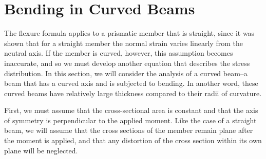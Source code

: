 \documentclass[
10pt,
a4paper,
openany,
svgnames,
]{book} %
\begin{document}
\section{Bending in Curved Beams}
                
The flexure formula applies to a prismatic member that is straight, since it was shown that for a straight member the normal strain varies linearly from the neutral axis. If the member is curved, however, this assumption becomes inaccurate, and so we must develop another equation that describes the stress distribution. In this section, we will consider the analysis of a curved beam--a beam that has a curved axis and is subjected to bending. In another word, these curved beams have relatively large thickness compared to their radii of curvature.

First, we must assume that the cross-sectional area is constant and that the axis of symmetry is perpendicular to the applied moment. Like the case of a straight beam, we will assume that the cross sections of the member remain plane after the moment is applied, and that any distortion of the cross section within its own plane will be neglected.
\end{document}
